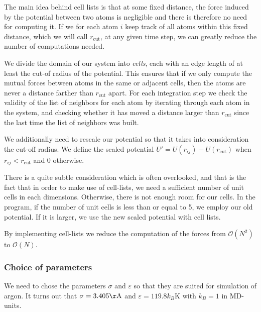 \documentclass[a4paper]{article}
\begin{document}
    The main idea behind cell lists is that at some fixed distance, the force
    induced by the potential between two atoms is negligible and there is
    therefore no need for computing it. If we for each atom $i$ keep track of
    all atoms within this fixed distance, which we will call $r_\mathrm{cut}$,
    at any given time step, we can greatly reduce the number of computations
    needed. 

    We divide the domain of our system into \emph{cells}, each with an edge
    length of at least the cut-of radius of the potential. This ensures that if
    we only compute the mutual forces between atoms in the same or adjacent
    cells, then the atoms are never a distance farther than $r_\mathrm{cut}$
    apart. For each integration step we check the validity of the list of
    neighbors for each atom by iterating through each atom in the system, and
    checking whether it has moved a distance larger than $r_\mathrm{cut}$ since
    the last time the list of neighbors was built. 
   
    We additionally need to rescale our potential so that it takes into
    consideration the cut-off radius. We define the scaled potential $U' =
    U(r_{ij}) - U(r_\mathrm{cut})$ when $r_{ij} < r_\mathrm{cut}$ and 0
    otherwise.
    
    There is a quite subtle consideration which is often overlooked, and that
    is the fact that in order to make use of cell-lists, we need a sufficient
    number of unit cells in each dimensions. Otherwise, there is not enough
    room for our cells.  In the program, if the number of unit cells is less
    than or equal to 5, we employ our old potential. If it is larger, we use
    the new scaled potential with cell lists.

    By implementing cell-lists we reduce the computation of the forces from
    $\mathcal{O}(N^2)$ to $\mathcal{O}(N)$. 
   
    \subsubsection{Choice of parameters}
    \label{ssub:choice_of_parameters}
    
    We need to chose the parameters $\sigma$ and $\varepsilon$ so that they are
    suited for simulation of argon. It turns out that $\sigma = 3.405
    \mathrm{\AA}$ and $\varepsilon = 119.8k_B\mathrm{K}$ with $k_B = 1$ in
    MD-units.
\end{document}
